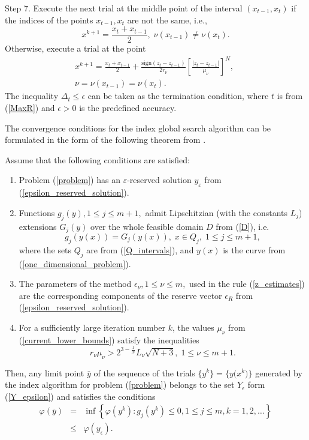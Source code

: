 \documentclass[twocolumn]{svjour3}          %
\begin{document}
Step 7. Execute the next trial at the middle point of the interval $(x_{t-1}, x_t)$ if the indices of the points $x_{t-1}, x_t$ are not the same, i.e.,
$$
	x^{k+1} = \frac{x_t + x_{t-1}}{2}, \; \nu(x_{t-1}) \neq \nu(x_t).
$$
Otherwise, execute a trial at the point
\begin{align*}
	x^{k+1} = \frac{x_t+x_{t-1}}{2} + \frac{\mathrm{sign}(z_t-z_{t-1})}{2r_\nu}\left[\frac{\left|z_t-z_{t-1}\right|}{\mu_\nu}\right]^N, \; \\
	\nu=\nu(x_{t-1})=\nu(x_t).
\end{align*}
The inequality $\Delta_t \leq \epsilon$ can be taken as the termination condition, where $t$ is from (\ref{MaxR}) and $\epsilon>0$ is the predefined accuracy.

	The convergence conditions for the index global search algorithm can be formulated in the form of the following theorem from \cite{Strongin2000}. 
\\
\begin{theorem}\label{theorem:1} Assume that the following conditions are satisfied:
	\begin{enumerate} 
		\item Problem (\ref{problem}) has an $\varepsilon$-reserved solution $y_{\varepsilon}$ from (\ref{epsilon_reserved_solution}).
		\item Functions $g_j(y), 1 \leq j \leq m+1,$ admit Lipschitzian (with the constants $L_j$) extensions $G_{j}(y)$ over the whole feasible domain $D$ from (\ref{D}), i.e.
	$$
		g_j \left( y(x) \right) = G_j \left( y(x) \right), \; x \in Q_j, \; 1 \leq j \leq m+1,
	$$
	where the sets $Q_j$ are from (\ref{Q_intervals}), and $y(x)$ is the curve from (\ref{one_dimensional_problem}).
		\item The parameters of the method $\epsilon_{\nu}, 1 \leq \nu \leq m,$ used in the rule (\ref{z_estimates}) are the corresponding components of the reserve vector $\epsilon_{R}$ from (\ref{epsilon_reserved_solution}).
		\item For a sufficiently large iteration number $k$, the values $\mu_{\nu}$ from (\ref{current_lower_bounds}) satisfy the inequalities
			\begin{equation}\label{theorem_inequalities}
				r_{\nu}\mu_{\nu} > 2^{3-\frac{1}{N}}L_{\nu}\sqrt{N+3}, \; 1 \leq \nu \leq m+1. 
			\end{equation}
	\end{enumerate}
	Then, any limit point $\bar{y}$ of the sequence of the trials $\{y^k\}=\big\{y\big(x^k\big)\big\}$ generated by the index algorithm for problem (\ref{problem}) belongs to the set $Y_{\epsilon}$ form (\ref{Y_epsilon}) and satisfies the conditions
	\begin{eqnarray*}
		\varphi(\bar y) & = &	\inf\left\{\varphi(y^k):g_j(y^k) \leq 0, 1 \leq j \leq m, k = 1,2,\ldots \right\} \\
		& \leq & \varphi(y_{\epsilon}).
	\end{eqnarray*}
\end{theorem}
\end{document}
